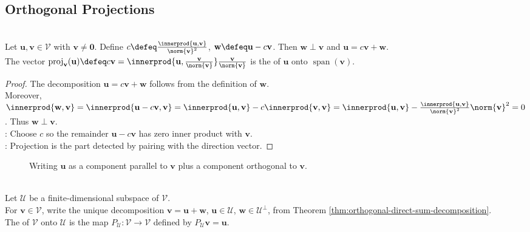 \subsection{Orthogonal Projections}

\begin{proposition} \label{prop:orthogonal-projection-onto-line}\label{prop:orthogonal-decomposition-one-vector} \\
Let $\mathbf{u},\mathbf{v}\in\mathcal{V}$ with $\mathbf{v}\neq\mathbf{0}$. Define $c\defeq\frac{\innerprod{\mathbf{u},\mathbf{v}}}{\norm{\mathbf{v}}^2}$, $\mathbf{w}\defeq\mathbf{u}-c\mathbf{v}$. Then $\mathbf{w}\perp\mathbf{v}$ and $\mathbf{u}=c\mathbf{v}+\mathbf{w}$.\\
The vector $\operatorname{proj}_{\mathbf{v}}(\mathbf{u})\defeq c\mathbf{v} =\innerprod{\mathbf{u},\frac{\mathbf{v}}{\norm{\mathbf{v}}}}\frac{\mathbf{v}}{\norm{\mathbf{v}}}$ is the  of $\mathbf{u}$ onto $\operatorname{span}(\mathbf{v})$.
\begin{proof}
The decomposition $\mathbf{u}=c\mathbf{v}+\mathbf{w}$ follows from the definition of $\mathbf{w}$.\\
Moreover, $\innerprod{\mathbf{w},\mathbf{v}} =\innerprod{\mathbf{u}-c\mathbf{v},\mathbf{v}} =\innerprod{\mathbf{u},\mathbf{v}}-c\innerprod{\mathbf{v},\mathbf{v}} =\innerprod{\mathbf{u},\mathbf{v}} -\frac{\innerprod{\mathbf{u},\mathbf{v}}}{\norm{\mathbf{v}}^2}\norm{\mathbf{v}}^2 =0$. Thus $\mathbf{w}\perp\mathbf{v}$.\\
: Choose $c$ so the remainder $\mathbf{u}-c\mathbf{v}$ has zero inner product with $\mathbf{v}$.\\
: Projection is the part detected by pairing with the direction vector.
\end{proof}
\end{proposition}

\begin{figure}[H]
  \centering
  
  \caption{Writing $\mathbf{u}$ as a component parallel to $\mathbf{v}$ plus a component orthogonal to $\mathbf{v}$.}
  \label{fig:orthogonal-decomposition-one-vector}
\end{figure}

\begin{definition} \label{def:orthogonal-projection-subspace} \\
Let $\mathcal{U}$ be a finite-dimensional subspace of $\mathcal{V}$.\\
For $\mathbf{v}\in\mathcal{V}$, write the unique decomposition $\mathbf{v}=\mathbf{u}+\mathbf{w}$, $\mathbf{u}\in\mathcal{U}$, $\mathbf{w}\in\mathcal{U}^{\perp}$, from Theorem \ref{thm:orthogonal-direct-sum-decomposition}.\\
The  of $\mathcal{V}$ onto $\mathcal{U}$ is the map $P_{\mathcal{U}}:\mathcal{V}\to\mathcal{V}$ defined by $P_{\mathcal{U}}\mathbf{v}=\mathbf{u}$.
\end{definition}

